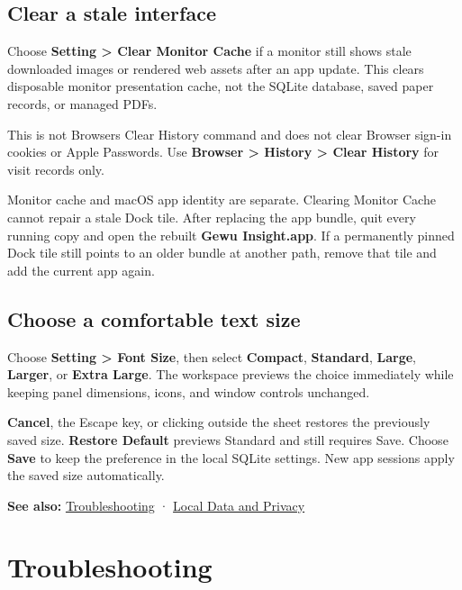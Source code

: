 \documentclass[10pt,letterpaper,oneside]{scrreprt}
\newenvironment{GewuRelated}{\par\nobreak\vspace{3pt}\nobreak\begingroup\small\sffamily\begin{samepage}\noindent}{\par\end{samepage}\endgroup}
\begin{document}
\section{Clear a stale interface}\label{clear-a-stale-interface}

Choose \textbf{Setting \textgreater{} Clear Monitor Cache} if a monitor still shows stale downloaded images or rendered web assets after an app update. This clears disposable monitor presentation cache, not the SQLite database, saved paper records, or managed PDFs.

This is not Browser\textquotesingle s Clear History command and does not clear Browser sign-in cookies or Apple Passwords. Use \textbf{Browser \textgreater{} History \textgreater{} Clear History} for visit records only.

Monitor cache and macOS app identity are separate. Clearing Monitor Cache cannot repair a stale Dock tile. After replacing the app bundle, quit every running copy and open the rebuilt \textbf{Gewu Insight.app}. If a permanently pinned Dock tile still points to an older bundle at another path, remove that tile and add the current app again.

\section{Choose a comfortable text size}\label{choose-a-comfortable-text-size}

Choose \textbf{Setting \textgreater{} Font Size}, then select \textbf{Compact}, \textbf{Standard}, \textbf{Large}, \textbf{Larger}, or \textbf{Extra Large}. The workspace previews the choice immediately while keeping panel dimensions, icons, and window controls unchanged.

\textbf{Cancel}, the Escape key, or clicking outside the sheet restores the previously saved size. \textbf{Restore Default} previews Standard and still requires Save. Choose \textbf{Save} to keep the preference in the local SQLite settings. New app sessions apply the saved size automatically.

\begin{GewuRelated}
\textbf{See also:} \hyperref[troubleshooting]{Troubleshooting} · \hyperref[privacy]{Local Data and Privacy}
\end{GewuRelated}

\chapter{Troubleshooting}\label{troubleshooting}
\end{document}

